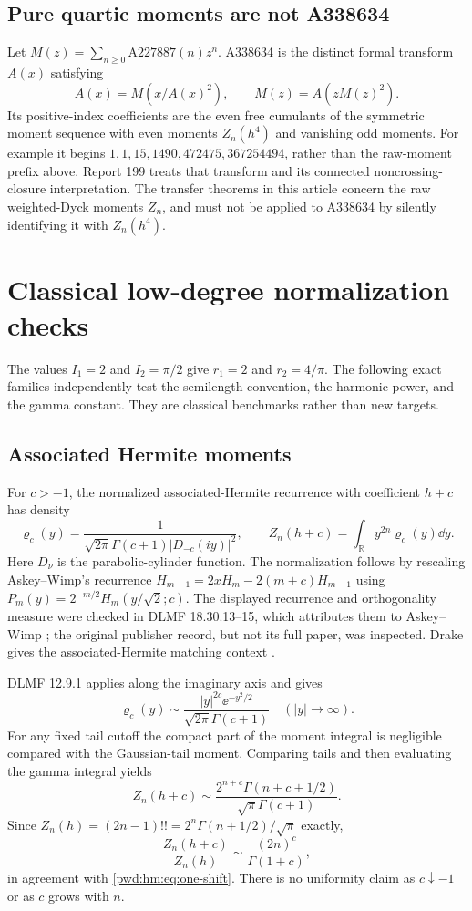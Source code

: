 \documentclass[11pt,letterpaper]{article}
\numberwithin{equation}{section}
\theoremstyle{remark}\newtheorem{remark}[theorem]{Remark}
\begin{document}
\subsection{Pure quartic moments are not A338634}
Let $M(z)=\sum_{n\ge0}\mathrm{A227887}(n)z^n$. A338634 is the distinct formal transform $A(x)$ satisfying
\[
 A(x)=M(x/A(x)^2),\qquad M(z)=A(zM(z)^2).
\]
Its positive-index coefficients are the even free cumulants of the symmetric moment sequence with even moments $Z_n(h^4)$ and vanishing odd moments. For example it begins
$1,1,15,1490,472475,367254494$, rather than the raw-moment prefix above. Report 199 treats that transform and its connected noncrossing-closure interpretation. The transfer theorems in this article concern the raw weighted-Dyck moments $Z_n$, and must not be applied to A338634 by silently identifying it with $Z_n(h^4)$.

\section{Classical low-degree normalization checks}\label{pwd:hm:sec:classical}
The values $I_1=2$ and $I_2=\pi/2$ give $r_1=2$ and $r_2=4/\pi$. The following exact families independently test the semilength convention, the harmonic power, and the gamma constant. They are classical benchmarks rather than new targets.

\subsection{Associated Hermite moments}
For $c>-1$, the normalized associated-Hermite recurrence with coefficient $h+c$ has density
\begin{equation}\label{pwd:hm:eq:hermite-density}
 \varrho_c(y)=\frac{1}{\sqrt{2\pi}\Gamma(c+1)|D_{-c}(iy)|^2},\qquad
 Z_n(h+c)=\int_{\mathbb R}y^{2n}\varrho_c(y)\dd y.
\end{equation}
Here $D_\nu$ is the parabolic-cylinder function. The normalization follows by rescaling Askey--Wimp's recurrence
$H_{m+1}=2xH_m-2(m+c)H_{m-1}$ using
$P_m(y)=2^{-m/2}H_m(y/\sqrt2;c)$. The displayed recurrence and orthogonality measure were checked in DLMF 18.30.13--15, which attributes them to Askey--Wimp \cite{dlmf,askeywimp}; the original publisher record, but not its full paper, was inspected. Drake gives the associated-Hermite matching context \cite{drake}.

DLMF 12.9.1 applies along the imaginary axis and gives
\[
 \varrho_c(y)\sim\frac{|y|^{2c}\ee^{-y^2/2}}{\sqrt{2\pi}\Gamma(c+1)}\quad(|y|\to\infty).
\]
For any fixed tail cutoff the compact part of the moment integral is negligible compared with the Gaussian-tail moment. Comparing tails and then evaluating the gamma integral yields
\[
 Z_n(h+c)\sim\frac{2^{n+c}\Gamma(n+c+1/2)}{\sqrt\pi\Gamma(c+1)}.
\]
Since $Z_n(h)=(2n-1)!!=2^n\Gamma(n+1/2)/\sqrt\pi$ exactly,
\begin{equation}\label{pwd:hm:eq:hermite-ratio}
 \frac{Z_n(h+c)}{Z_n(h)}\sim\frac{(2n)^c}{\Gamma(1+c)},
\end{equation}
in agreement with \eqref{pwd:hm:eq:one-shift}. There is no uniformity claim as $c\downarrow-1$ or as $c$ grows with $n$.
\end{document}
